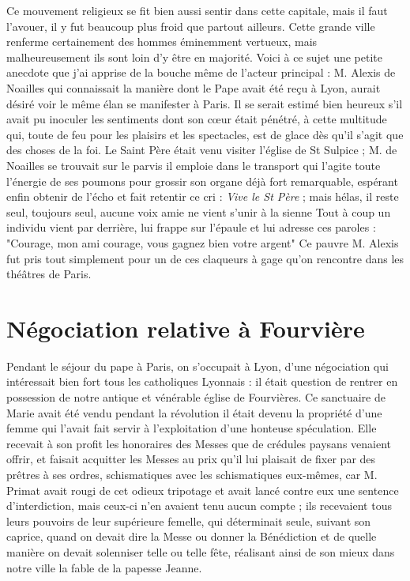 \documentclass[11pt,a4paper]{report}
\begin{document}
Ce mouvement religieux se fit bien aussi sentir dans cette capitale, mais il faut l'avouer, il y fut beaucoup plus froid que partout ailleurs. Cette grande ville renferme certainement des hommes éminemment vertueux, mais malheureusement ils sont loin d'y être en majorité. Voici à ce sujet une petite anecdote que j'ai apprise de la bouche même de l'acteur principal : M. Alexis de Noailles qui connaissait la manière dont le Pape avait été reçu à Lyon, aurait désiré voir le même élan se manifester à Paris. Il se serait estimé bien heureux s'il avait pu inoculer les sentiments dont son cœur était pénétré, à cette multitude qui, toute de feu pour les plaisirs et les spectacles, est de glace dès qu'il s'agit que des choses de la foi. Le Saint Père était venu visiter l'église de St Sulpice ; M. de Noailles se trouvait sur le parvis il emploie dans le transport qui l'agite toute l'énergie de ses poumons pour grossir son organe déjà fort remarquable, espérant enfin obtenir de l'écho et fait retentir ce cri : \textit{Vive le St Père} ; mais hélas, il reste seul, toujours seul, aucune voix amie ne vient s'unir à la sienne Tout à coup un individu vient par derrière, lui frappe sur l'épaule et lui adresse ces paroles : "Courage, mon ami courage, vous gagnez bien votre argent" Ce pauvre M. Alexis fut pris tout simplement pour un de ces claqueurs à gage qu'on rencontre dans les théâtres de Paris.

\section*{Négociation relative à Fourvière}

Pendant le séjour du pape à Paris, on s'occupait à Lyon, d'une négociation qui intéressait bien fort tous les catholiques Lyonnais : il était question de rentrer en possession de notre antique et vénérable église de Fourvières. Ce sanctuaire de Marie avait été vendu pendant la révolution il était devenu la propriété d'une femme qui l'avait fait servir à l'exploitation d'une honteuse spéculation. Elle recevait à son profit les honoraires des Messes que de crédules paysans venaient offrir, et faisait acquitter les Messes au prix qu'il lui plaisait de fixer par des prêtres à ses ordres, schismatiques avec les schismatiques eux-mêmes, car M. Primat avait rougi de cet odieux tripotage et avait lancé contre eux une sentence d'interdiction, mais ceux-ci n'en avaient tenu aucun compte ; ils recevaient tous leurs pouvoirs de leur supérieure femelle, qui déterminait seule, suivant son caprice, quand on devait dire la Messe ou donner la Bénédiction et de quelle manière on devait solenniser telle ou telle fête, réalisant ainsi de son mieux dans notre ville la fable de la papesse Jeanne.
\end{document}
